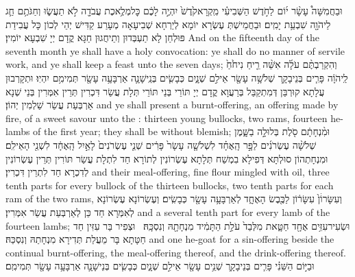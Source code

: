 {וּבַחֲמִשָּׁה֩ עָשָׂ֨ר י֜וֹם לַחֹ֣דֶשׁ הַשְּׁבִיעִ֗י מִֽקְרָא\maqqaf קֹ֙דֶשׁ֙ יִהְיֶ֣ה לָכֶ֔ם כׇּל\maqqaf מְלֶ֥אכֶת עֲבֹדָ֖ה לֹ֣א תַעֲשׂ֑וּ וְחַגֹּתֶ֥ם חַ֛ג לַיהֹוָ֖ה שִׁבְעַ֥ת יָמִֽים׃}
{וּבַחֲמֵישְׁתְּ עֶשְׂרָא יוֹמָא לְיַרְחָא שְׁבִיעָאָה מְעָרַע קַדִּישׁ יְהֵי לְכוֹן כָּל עֲבִידַת פּוּלְחַן לָא תַעְבְּדוּן וְתֵיחֲגוּן חַגָּא קֳדָם יְיָ שִׁבְעָא יוֹמִין׃}
{And on the fifteenth day of the seventh month ye shall have a holy convocation: ye shall do no manner of servile work, and ye shall keep a feast unto the \lord\space seven days;}{}
{וְהִקְרַבְתֶּ֨ם עֹלָ֜ה אִשֵּׁ֨ה רֵ֤יחַ נִיחֹ֙חַ֙ לַֽיהֹוָ֔ה פָּרִ֧ים בְּנֵי\maqqaf בָקָ֛ר שְׁלֹשָׁ֥ה עָשָׂ֖ר אֵילִ֣ם שְׁנָ֑יִם כְּבָשִׂ֧ים בְּנֵֽי\maqqaf שָׁנָ֛ה אַרְבָּעָ֥ה עָשָׂ֖ר תְּמִימִ֥ם יִהְיֽוּ׃}
{וּתְקָרְבוּן עֲלָתָא קוּרְבַּן דְּמִתְקַבַּל בְּרַעֲוָא קֳדָם יְיָ תּוֹרֵי בְּנֵי תּוֹרֵי תְּלָת עֲשַׂר דִּכְרִין תְּרֵין אִמְּרִין בְּנֵי שְׁנָא אַרְבְּעַת עֲשַׂר שַׁלְמִין יְהוֹן׃}
{and ye shall present a burnt-offering, an offering made by fire, of a sweet savour unto the \lord: thirteen young bullocks, two rams, fourteen he-lambs of the first year; they shall be without blemish;}{}
{וּמִ֨נְחָתָ֔ם סֹ֖לֶת בְּלוּלָ֣ה בַשָּׁ֑מֶן שְׁלֹשָׁ֨ה עֶשְׂרֹנִ֜ים לַפָּ֣ר הָֽאֶחָ֗ד לִשְׁלֹשָׁ֤ה עָשָׂר֙ פָּרִ֔ים שְׁנֵ֤י עֶשְׂרֹנִים֙ לָאַ֣יִל הָֽאֶחָ֔ד לִשְׁנֵ֖י הָאֵילִֽם׃}
{וּמִנְחָתְהוֹן סוּלְתָּא דְּפִילָא בִמְשַׁח תְּלָתָא עֶשְׂרוֹנִין לְתוֹרָא חַד לִתְלָת עֲשַׂר תּוֹרִין תְּרֵין עֶשְׂרוֹנִין לְדִכְרָא חַד לִתְרֵין דִּכְרִין׃}
{and their meal-offering, fine flour mingled with oil, three tenth parts for every bullock of the thirteen bullocks, two tenth parts for each ram of the two rams,}{}
{וְעִשָּׂרוֹׄן֙ עִשָּׂר֔וֹן לַכֶּ֖בֶשׂ הָאֶחָ֑ד לְאַרְבָּעָ֥ה עָשָׂ֖ר כְּבָשִֽׂים׃}
{וְעֶשְׂרוֹנָא עֶשְׂרוֹנָא לְאִמְּרָא חַד כֵּן לְאַרְבְּעַת עֲשַׂר אִמְּרִין׃}
{and a several tenth part for every lamb of the fourteen lambs;}{}
{וּשְׂעִיר\maqqaf עִזִּ֥ים אֶחָ֖ד חַטָּ֑את מִלְּבַד֙ עֹלַ֣ת הַתָּמִ֔יד מִנְחָתָ֖הּ וְנִסְכָּֽהּ׃ \setuma }
{וּצְפִיר בַּר עִזִּין חַד חַטָּתָא בָּר מֵעֲלַת תְּדִירָא מִנְחָתַהּ וְנִסְכַּהּ׃}
{and one he-goat for a sin-offering beside the continual burnt-offering, the meal-offering thereof, and the drink-offering thereof.}{}
{וּבַיּ֣וֹם הַשֵּׁנִ֗י פָּרִ֧ים בְּנֵי\maqqaf בָקָ֛ר שְׁנֵ֥ים עָשָׂ֖ר אֵילִ֣ם שְׁנָ֑יִם כְּבָשִׂ֧ים בְּנֵי\maqqaf שָׁנָ֛ה אַרְבָּעָ֥ה עָשָׂ֖ר תְּמִימִֽם׃}
